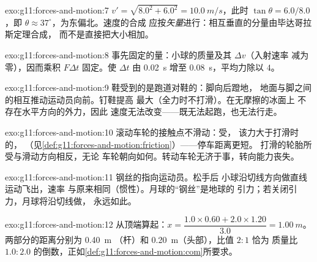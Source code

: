 \begin{solution}{exo:g11:forces-and-motion:7}
$v' = \sqrt{8.0^2 + 6.0^2} = \qty{10.0}{m/s}$，此时 $\tan\theta =
6.0/8.0$，即 $\theta \approx 37^\circ$，为东偏北。速度的合成
应按\emph{矢量}进行：相互垂直的分量由毕达哥拉斯定理合成，
而不是直接把大小相加。
\end{solution}

\begin{solution}{exo:g11:forces-and-motion:8}
事先固定的量：小球的质量及其 $\Delta v$（入射速率
减为零），因而乘积 $F\Delta t$ 固定。使 $\Delta t$ 由
\qty{0.02}{s} 增至 \qty{0.08}{s}，平均力除以 $4$。
\end{solution}

\begin{solution}{exo:g11:forces-and-motion:9}
鞋受到的是跑道对鞋的：脚向后蹬地，
地面与脚之间的相互推动运动员向前。钉鞋提高
最大（全力时不打滑）。在无摩擦的冰面上
不存在水平方向的外力，因此
速度无法改变——既无法起跑，也无法行走。
\end{solution}

\begin{solution}{exo:g11:forces-and-motion:10}
滚动车轮的接触点不滑动：受，
该力大于打滑时的，
（见\cref{def:g11:forces-and-motion:friction}）——停车距离更短。
打滑的轮胎所受与滑动方向相反，无论
车轮朝向如何。转动车轮无济于事，转向能力丧失。
\end{solution}

\begin{solution}{exo:g11:forces-and-motion:11}
钢丝的指向运动员。松手后
小球沿切线方向做直线运动飞出，速率
与原来相同（惯性）。月球的“钢丝”是地球的
引力；若关闭引力，月球将沿切线做，
永远如此。
\end{solution}

\begin{solution}{exo:g11:forces-and-motion:12}
从顶端算起：$x = \dfrac{1.0 \times 0.60 + 2.0 \times 1.20}{3.0}
= \qty{1.00}{m}$。两部分的距离分别为 \qty{0.40}{m}
（杆）和 \qty{0.20}{m}（头部），比值 $2 : 1$ 恰为
质量比 $1.0 : 2.0$ 的倒数，正如\cref{def:g11:forces-and-motion:com}所要求。
%
\end{solution}

